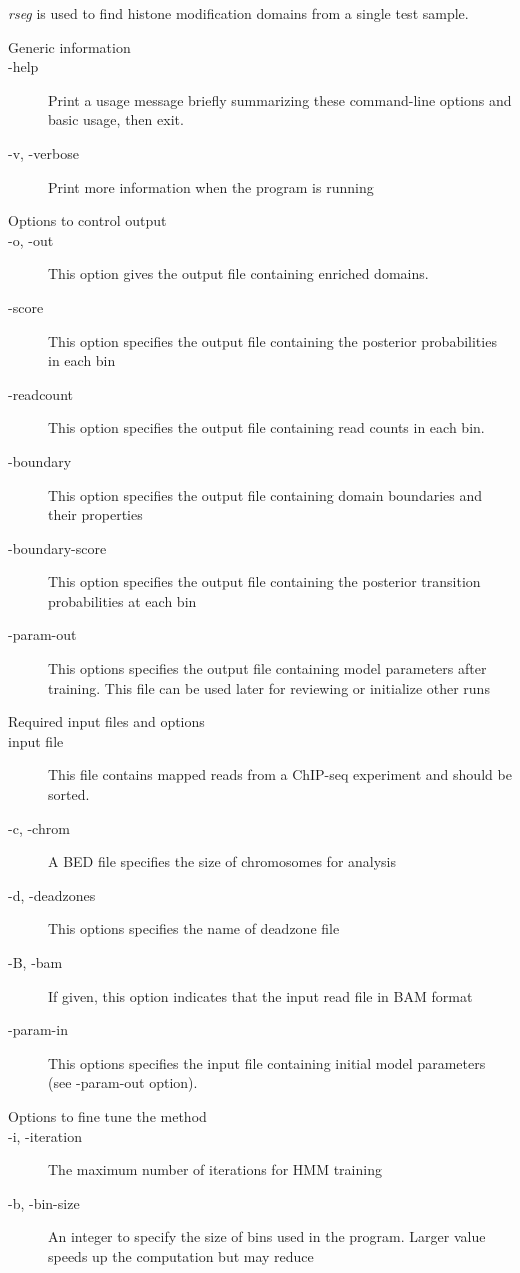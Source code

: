 \documentclass[11pt]{report}
\begin{document}
\textit{rseg} is used to find histone modification domains from a
single test sample. 

\begin{description}
\item[Generic information]
\item[-help] Print a usage message briefly summarizing these
  command-line options and basic usage, then exit.
\item[-v, -verbose] Print more information when the program is running
\item[Options to control output]
\item[-o, -out] This option gives the output file containing enriched domains.
\item[-score] This option specifies the output file containing the posterior
  probabilities in each bin
\item[-readcount] This option specifies the output file containing read counts
  in each bin.
\item[-boundary] This option specifies the output file containing domain
  boundaries and their properties
\item[-boundary-score] This option specifies the output file containing the
  posterior transition probabilities at each bin
\item[-param-out] This options specifies the output file containing model
  parameters after training. This file can be used later for reviewing or
  initialize other runs
\item[Required input files and options]
\item[input file] This file contains mapped reads from a
  ChIP-seq experiment and should be sorted.
\item[-c, -chrom] A BED file specifies the size of chromosomes for
  analysis
\item[-d, -deadzones] This options specifies the name of deadzone
  file
\item[-B, -bam] If given, this option indicates that the input read file in BAM
  format
\item[-param-in] This options specifies the input file containing initial model
  parameters (see -param-out option).
\item[Options to fine tune the method]
\item[-i, -iteration] The maximum number of iterations for HMM
  training
\item[-b, -bin-size] An integer to specify the size of bins used in
  the program. Larger value speeds up the computation but may reduce

\end{description}
\end{document}
